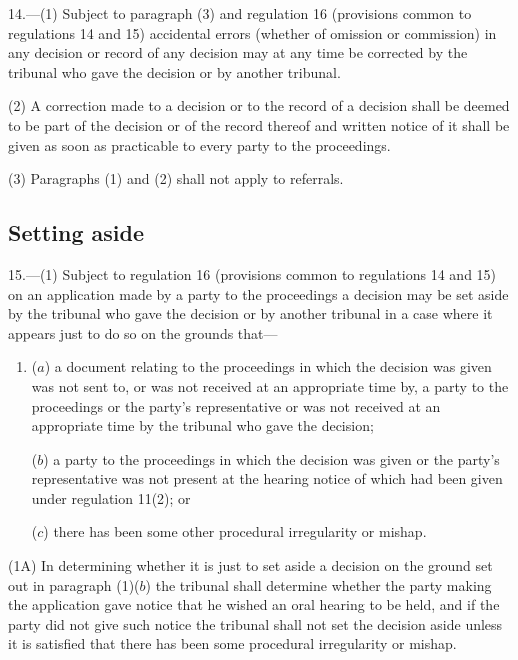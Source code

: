\documentclass[12pt,a4paper]{article}
\begin{document}
14.—(1) Subject to 
paragraph (3) and  %
regulation 16 (provisions common to regulations 14 and 15) accidental errors (whether of omission or commission) in any decision or record of any decision may at any time be corrected by the tribunal who gave the decision or by another tribunal.

(2) A correction made to a decision or to the record of a decision shall be deemed to be part of the decision or of the record thereof and written notice of it shall be given as soon as practicable to every party to the proceedings.

(3) Paragraphs (1) and (2) shall not apply to referrals.


\subsection[15. Setting aside]{Setting aside}

15.—(1) Subject to regulation 16 (provisions common to regulations 14 and 15) on an application made by a party to the proceedings a decision may be set aside by the tribunal who gave the decision or by another tribunal in a case where it appears just to do so on the grounds that---
\begin{enumerate}\item[]
($a$) a document relating to the proceedings in which the decision was given was not sent to, or was not received at an appropriate time by, a party to the proceedings or the party’s representative or was not received at an appropriate time by the tribunal who gave the decision;

($b$) a party to the proceedings in which the decision was given or the party’s representative was not present at the hearing notice of which had been given under regulation 11(2); or

($c$) there has been some other procedural irregularity or mishap.
\end{enumerate}

(1A) In determining whether it is just to set aside a decision on the ground set out in paragraph (1)($b$) the tribunal shall determine whether the party making the application gave notice that he wished an oral hearing to be held, and if the party did not give such notice the tribunal shall not set the decision aside unless it is satisfied that there has been some procedural irregularity or mishap.
\end{document}
